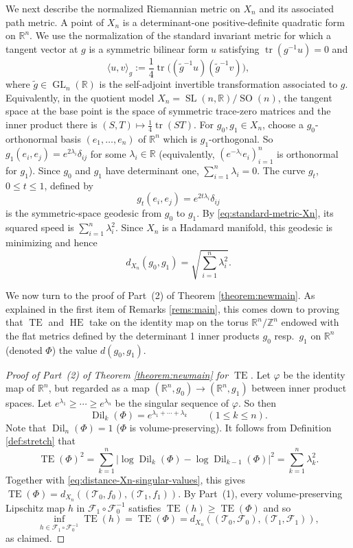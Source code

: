 \documentclass[11pt,letterpaper]{amsart}
\theoremstyle{definition}
\numberwithin{equation}{section}
\theoremstyle{definition}
\newcommand{\Fc}{\mathcal{F}}
\newcommand{\Tc}{\mathcal{T}}
\newcommand{\Rb}{\mathbb{R}}
\newcommand{\Zb}{\mathbb{Z}}
\DeclareMathOperator{\GL}{GL}
\DeclareMathOperator{\SL}{SL}
\DeclareMathOperator{\SO}{SO}
\DeclareMathOperator{\TE}{TE}
\DeclareMathOperator{\HE}{HE}
\newcommand{\Dil}{\operatorname{Dil}}
\begin{document}
We next describe the normalized Riemannian metric on $X_n$ and its associated path metric. A point of $X_n$ is a  determinant-one positive-definite 
quadratic form on $\Rb^n$.   We use the normalization of the standard invariant metric for which a tangent vector at $g$ is a symmetric bilinear form $u$ satisfying $\operatorname{tr}(g^{-1}u)=0$ and
\begin{equation}
\label{eq:standard-metric-Xn}
\textstyle \langle u,v\rangle_g :=\frac14\operatorname{tr}\big((\tilde g^{-1}u)(\tilde g^{-1}v)\big),
\end{equation}
where $\tilde g\in \GL_n(\Rb)$ is the self-adjoint invertible transformation associated to $g$.
Equivalently, in the quotient model $X_n=\SL(n,\Rb)/\SO(n)$, the tangent space at the base point is the space of symmetric trace-zero matrices and the inner product there is $(S,T)\mapsto\frac14\operatorname{tr}(ST)$.  For $g_0,g_1\in X_n$, choose a $g_0$-orthonormal basis $(e_1,\ldots,e_n)$ 
of $\Rb^n$ which is $g_1$-orthogonal.  So $g_1(e_i,e_j)=e^{2\lambda_i}\delta_{ij}$ for some $\lambda_i\in \Rb$ (equivalently,  $(e^{-\lambda_i}e_i)_{i=1}^n$ is orthonormal for $g_1$).
Since $g_0$ and $g_1$ have determinant one, $\sum_{i=1}^n\lambda_i=0$.  The curve $g_t$, $0\leq t\leq 1$, defined by
\[
g_t(e_i,e_j)=e^{2t\lambda_i}\delta_{ij}
\]
is the symmetric-space geodesic from $g_0$ to $g_1$.
By \eqref{eq:standard-metric-Xn}, its squared speed is $\sum_{i=1}^n\lambda_i^2$. 
Since $X_n$ is a Hadamard manifold, this geodesic is minimizing and hence
\begin{equation}
\label{eq:distance-Xn-singular-values}
\textstyle d_{X_n}(g_0,g_1)=\sqrt{\sum_{i=1}^n\lambda_i^2}.
\end{equation}

We now turn to the proof of Part~(2) of Theorem \ref{theorem:newmain}. As explained in the first item of  Remarks \ref{rems:main}, this comes down to
proving that $\TE$ and $\HE$ take on  the identity map on the torus $\Rb^n/\Zb^n$ endowed with the flat metrics defined
by the determinant 1 inner products $g_0$ resp.\ $g_1$ on $\Rb^n$ (denoted $\Phi$) the value $d(g_0,g_1)$.

\begin{proof}[Proof of Part~(2) of Theorem  \ref{theorem:newmain} for $\TE$]
Let $\varphi$ be the identity map of $\Rb^n$, but regarded as a map   $(\Rb^n,g_0)\longrightarrow (\Rb^n,g_1)$ between inner product spaces. Let  $e^{\lambda_1}\ge \cdots \ge e^{\lambda_n}$ be the singular sequence of $\varphi$.  So then
\[
\Dil_k(\Phi)=e^{\lambda_1+\cdots+\lambda_k}
\qquad (1\leq k\leq n).
\]
Note that $\Dil_n(\Phi)=1$ ($\Phi$ is volume-preserving).  It follows from Definition \ref{def:stretch} that
\[
\textstyle \TE(\Phi)^2
=\sum_{k=1}^n
\left|\log\Dil_k(\Phi)-\log\Dil_{k-1}(\Phi)\right|^2 =\sum_{k=1}^n\lambda_k^2.
\]
Together with \eqref{eq:distance-Xn-singular-values}, this gives
$\TE(\Phi)=d_{X_n}((\Tc_0, f_0),(\Tc_1,f_1))$.
By Part~(1), every volume-preserving Lipschitz map $h$ in $\Fc_1\circ \Fc_0^{-1}$ satisfies $\TE(h)\geq\TE(\Phi)$ and so
\[
\inf_{h\in  \Fc_1\circ \Fc_0^{-1}}\TE(h)
=\TE(\Phi)
=d_{X_n}((\Tc_0,\Fc_0),(\Tc_1,\Fc_1)),
\]
as claimed.
\end{proof}
\end{document}
